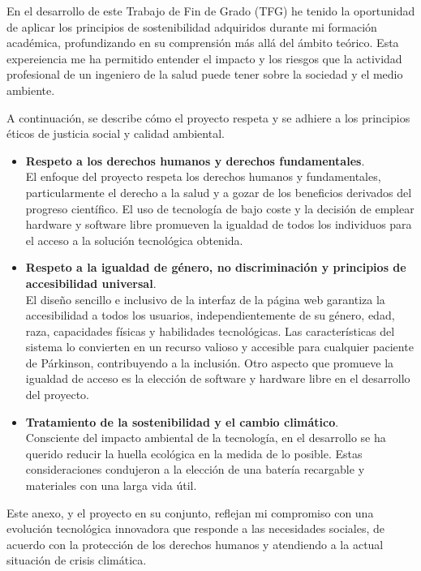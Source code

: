 
En el desarrollo de este Trabajo de Fin de Grado (TFG) he tenido la oportunidad de aplicar los principios de sostenibilidad adquiridos durante mi formación académica, profundizando en su comprensión más allá del ámbito teórico. Esta expereiencia me ha permitido entender el impacto y los riesgos que la actividad profesional de un ingeniero de la salud puede tener sobre la sociedad y el medio ambiente. 

A continuación, se describe cómo el proyecto respeta y se adhiere a los principios éticos de justicia social y calidad ambiental.

\begin{itemize}
    \item \textbf{Respeto a los derechos humanos y derechos fundamentales}.\\
    El enfoque del proyecto respeta los derechos humanos y fundamentales, particularmente el derecho a la salud y a gozar de los beneficios derivados del progreso científico. El uso de tecnología de bajo coste y la decisión de emplear hardware y software libre promueven la igualdad de todos los individuos para el acceso a la solución tecnológica obtenida.
    
    \item \textbf{Respeto a la igualdad de género, no discriminación y principios de accesibilidad universal}.\\
    El diseño sencillo e inclusivo de la interfaz de la página web garantiza la accesibilidad a todos los usuarios, independientemente de su género, edad, raza, capacidades físicas y habilidades tecnológicas. Las características del sistema lo convierten en un recurso valioso y accesible para cualquier paciente de Párkinson, contribuyendo a la inclusión. Otro aspecto que promueve la igualdad de acceso es la elección de software y hardware libre en el desarrollo del proyecto.
    
    \item \textbf{Tratamiento de la sostenibilidad y el cambio climático}.\\
    Consciente del impacto ambiental de la tecnología, en el desarrollo se ha querido reducir la huella ecológica en la medida de lo posible. Estas consideraciones condujeron a la elección de una batería recargable y materiales con una larga vida útil.
\end{itemize}

Este anexo, y el proyecto en su conjunto, reflejan mi compromiso con una evolución tecnológica innovadora que responde a las necesidades sociales, de acuerdo con la protección de los derechos humanos y atendiendo a la actual situación de crisis climática.

